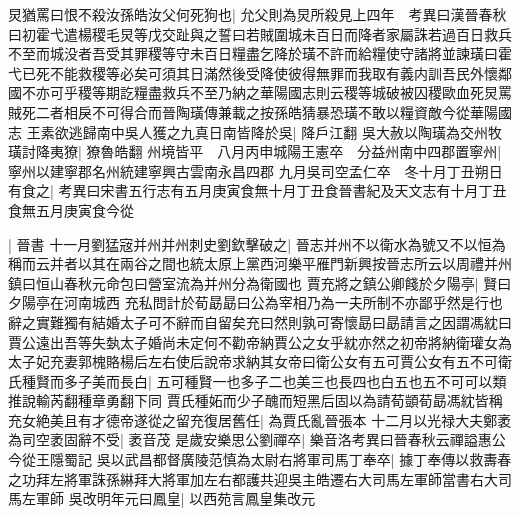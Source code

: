 炅猶罵曰恨不殺汝孫皓汝父何死狗也|{
	允父則為炅所殺見上四年　考異曰漢晉春秋曰初霍弋遣楊稷毛炅等戊交趾與之誓曰若賊圍城未百日而降者家屬誅若過百日救兵不至而城没者吾受其罪稷等守未百日糧盡乞降於璜不許而給糧使守諸將並諫璜曰霍弋已死不能救稷等必矣可須其日滿然後受降使彼得無罪而我取有義内訓吾民外懷鄰國不亦可乎稷等期訖糧盡救兵不至乃納之華陽國志則云稷等城破被囚稷歐血死炅罵賊死二者相戾不可得合而晉陶璜傳兼載之按孫皓猜暴恐璜不敢以糧資敵今從華陽國志}
王素欲逃歸南中吳人獲之九真日南皆降於吳|{
	降戶江翻}
吳大赦以陶璜為交州牧璜討降夷獠|{
	獠魯皓翻}
州境皆平　八月丙申城陽王憲卒　分益州南中四郡置寧州|{
	寧州以建寧郡名州統建寧興古雲南永昌四郡}
九月吳司空孟仁卒　冬十月丁丑朔日有食之|{
	考異曰宋書五行志有五月庚寅食無十月丁丑食晉書紀及天文志有十月丁丑食無五月庚寅食今從}


|{
	晉書}
十一月劉猛宼并州并州刺史劉欽擊破之|{
	晉志并州不以衛水為號又不以恒為稱而云并者以其在兩谷之間也統太原上黨西河樂平雁門新興按晉志所云以周禮并州鎮曰恒山春秋元命包曰營室流為并州分為衛國也}
賈充將之鎮公卿餞於夕陽亭|{
	賢曰夕陽亭在河南城西}
充私問計於荀勗勗曰公為宰相乃為一夫所制不亦鄙乎然是行也辭之實難獨有結婚太子可不辭而自留矣充曰然則孰可寄懷勗曰勗請言之因謂馮紞曰賈公遠出吾等失埶太子婚尚未定何不勸帝納賈公之女乎紞亦然之初帝將納衛瓘女為太子妃充妻郭槐賂楊后左右使后說帝求納其女帝曰衛公女有五可賈公女有五不可衛氏種賢而多子美而長白|{
	五可種賢一也多子二也美三也長四也白五也五不可可以類推說輸芮翻種章勇翻下同}
賈氏種妬而少子醜而短黑后固以為請荀顗荀勗馮紞皆稱充女絶美且有才德帝遂從之留充復居舊任|{
	為賈氏亂晉張本}
十二月以光禄大夫鄭袤為司空袤固辭不受|{
	袤音茂}
是歲安樂思公劉禪卒|{
	樂音洛考異曰晉春秋云禪謚惠公今從王隱蜀記}
吳以武昌都督廣陵范慎為太尉右將軍司馬丁奉卒|{
	據丁奉傳以救夀春之功拜左將軍誅孫綝拜大將軍加左右都護共迎吳主皓遷右大司馬左軍師當書右大司馬左軍師}
吳改明年元曰鳳皇|{
	以西苑言鳳皇集改元}


